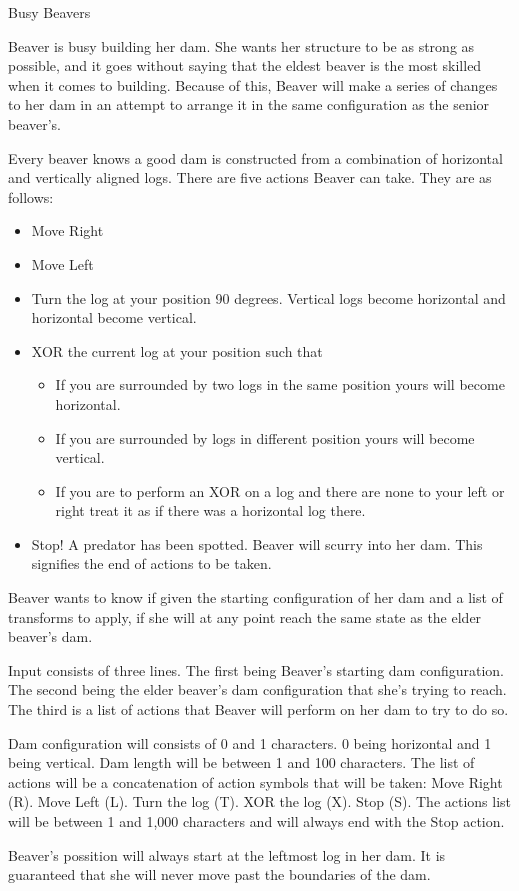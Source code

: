 \begin{problem}{Busy Beavers}

Beaver is busy building her dam. She wants her structure to be as strong as possible, and it goes without saying that the eldest beaver is the most skilled when it comes to building. Because of this, Beaver will make a series of changes to her dam in an attempt to arrange it in the same configuration as the senior beaver’s.

Every beaver knows a good dam is constructed from a combination of horizontal and vertically aligned logs. There are five actions Beaver can take. They are as follows:

\begin{itemize}
 	\item Move Right
	\item Move Left
	\item Turn the log at your position 90 degrees. Vertical logs become horizontal and horizontal become vertical.
	\item { XOR the current log at your position such that
	\begin{itemize}
		\item If you are surrounded by two logs in the same position yours will become horizontal.
		\item If you are surrounded by logs in different position yours will become vertical.
		\item If you are to perform an XOR on a log and there are none to your left or right treat it as if there was a horizontal log there.
	\end{itemize}
	}
	\item Stop! A predator has been spotted. Beaver will scurry into her dam. This signifies the end of actions to be taken.
\end{itemize}

Beaver wants to know if given the starting configuration of her dam and a list of transforms to apply, if she will at any point reach the same state as the elder beaver’s dam.

\end{problem}

\begin{formalin}
Input consists of three lines. The first being Beaver’s starting dam configuration. The second being the elder beaver’s dam configuration that she’s trying to reach. The third is a list of actions that Beaver will perform on her dam to try to do so.

Dam configuration will consists of 0 and 1 characters. 0 being horizontal and 1 being vertical. Dam length will be between 1 and 100 characters. The list of actions will be a concatenation of action symbols that will be taken: Move Right (R). Move Left (L). Turn the log (T). XOR the log (X). Stop (S). The actions list will be between 1 and 1,000 characters and will always end with the Stop action.

Beaver's possition will always start at the leftmost log in her dam. It is guaranteed that she will never move past the boundaries of the dam.
\end{formalin}

